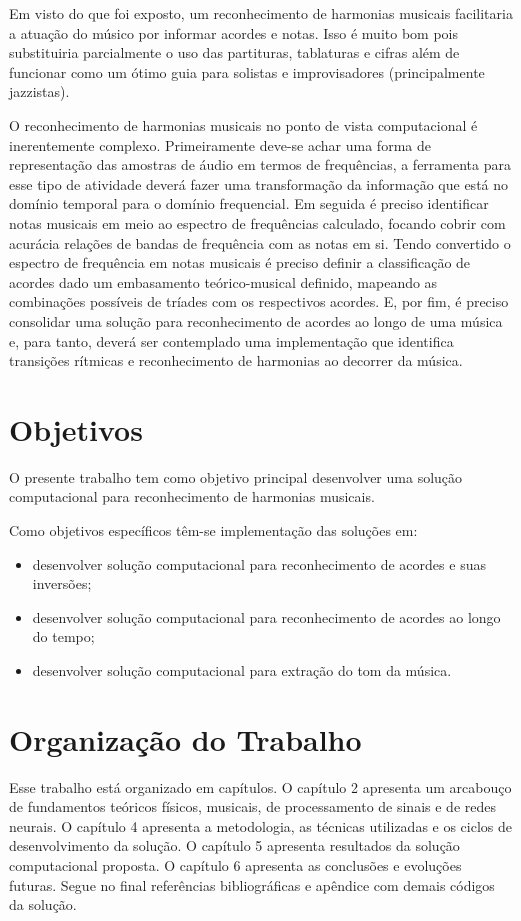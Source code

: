 Em visto do que foi exposto, um reconhecimento de harmonias musicais facilitaria a atuação do músico por informar acordes e notas. Isso é muito bom pois substituiria parcialmente o uso das partituras, tablaturas e cifras além de funcionar como um ótimo guia para solistas e improvisadores (principalmente jazzistas).

O reconhecimento de harmonias musicais no ponto de vista computacional é inerentemente complexo. Primeiramente deve-se achar uma forma de representação das amostras de áudio em termos de frequências, a ferramenta para esse tipo de atividade deverá fazer uma transformação da informação que está no domínio temporal para o domínio frequencial. Em seguida é preciso identificar notas musicais em meio ao espectro de frequências calculado, focando cobrir com acurácia relações de bandas de frequência com as notas em si. Tendo convertido o espectro de frequência em notas musicais é preciso definir a classificação de acordes dado um embasamento teórico-musical definido, mapeando as combinações possíveis de tríades com os respectivos acordes. E, por fim, é preciso consolidar uma solução para reconhecimento de acordes ao longo de uma música e, para tanto, deverá ser contemplado uma implementação que identifica transições rítmicas e reconhecimento de harmonias ao decorrer da música.

\section{Objetivos}
\label{sec:objetivos}

O presente trabalho tem como objetivo principal desenvolver uma solução computacional para reconhecimento de harmonias musicais.

Como objetivos específicos têm-se implementação das soluções em:
\begin{itemize}
\item desenvolver solução computacional para reconhecimento de acordes e suas inversões;
\item desenvolver solução computacional para reconhecimento de acordes ao longo do tempo;
\item desenvolver solução computacional para extração do tom da música.
\end{itemize}


\section{Organização do Trabalho}
\label{sec:organizacao}

Esse trabalho está organizado em capítulos. O capítulo 2 apresenta um arcabouço de fundamentos teóricos físicos, musicais, de processamento de sinais e de redes neurais. O capítulo 4 apresenta a metodologia, as técnicas utilizadas e os ciclos de desenvolvimento da solução. O capítulo 5 apresenta resultados da solução computacional proposta. O capítulo 6 apresenta as conclusões e evoluções futuras. Segue no final referências bibliográficas e apêndice com demais códigos da solução.

